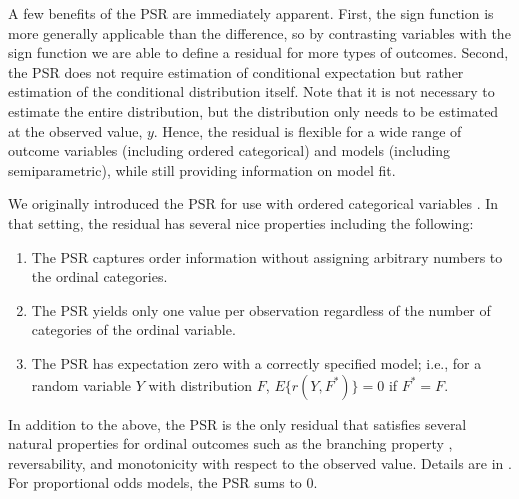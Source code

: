 \documentclass[12pt, usenatbib]{article}
\begin{document}
A few benefits of the PSR are immediately apparent.  First, the sign function is more generally applicable than the difference, so by contrasting variables with the sign function we are able to define a residual for more types of outcomes.  Second, the PSR does not require estimation of conditional expectation but rather estimation of the conditional distribution itself.  Note that it is not necessary to estimate the entire distribution, but the distribution only needs to be estimated at the observed value, $y$.  Hence, the residual is flexible for a wide range of outcome variables (including ordered categorical) and models (including semiparametric), while still providing information on model fit. 

We originally introduced the PSR for use with ordered categorical variables \citep{li2010test,li2012new}.  In that setting, the residual has several nice properties including the following: 
\begin{enumerate}
\item The PSR captures order information without assigning arbitrary numbers to the ordinal categories.  
\item The PSR yields only one value per observation regardless of the number of categories of the ordinal variable. 
\item The PSR has expectation zero with a correctly specified model; i.e., for a random variable $Y$ with distribution $F$, $E\{r(Y,F^*)\}=0$ if $F^*=F$.
\end{enumerate}
In addition to the above, the PSR is the only residual that satisfies several natural properties for ordinal outcomes such as the branching property \citep{brockett1977characterization}, reversability, and monotonicity with respect to the observed value.  Details are in \cite{li2012new}.  For proportional odds models, the PSR sums to 0.  
\end{document}
